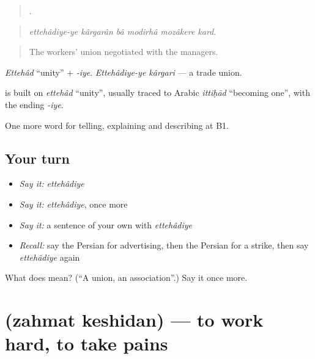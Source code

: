 \begin{quote}
     .
\end{quote}

\begin{quote}
\emph{ettehâdiye-ye kârgarân bâ modirhâ mozâkere kard.}
\end{quote}

\begin{quote}
The workers' union negotiated with the managers.
\end{quote}

\emph{Ettehâd} \textquotedblleft{}unity\textquotedblright{} + \emph{-iye}. \emph{Ettehâdiye-ye kârgari} — a trade union.

\begin{cousinweb}
\textbf{} is built on \emph{ettehâd} \textquotedblleft{}unity\textquotedblright{}, usually traced to Arabic \emph{ittiḥād} \textquotedblleft{}becoming one\textquotedblright{}, with the ending \emph{-iye}.
\end{cousinweb}

\begin{grammarlens}[title={What you've built}]
One more word for telling, explaining and describing at B1.
\end{grammarlens}

\subsection*{Your turn}
\begin{itemize}
\raggedright
  \item \emph{Say it:} \emph{ettehâdiye}
  \item \emph{Say it:} \emph{ettehâdiye}, once more
  \item \emph{Say it:} a sentence of your own with \emph{ettehâdiye}
  \item \emph{Recall:} say the Persian for advertising, then the Persian for a strike, then say \emph{ettehâdiye} again
\end{itemize}

\begin{tcolorbox}[breakable,colback=teal!4,colframe=teal!35!black,title={Before you move on}]
What does  mean? (\textquotedblleft{}A union, an association\textquotedblright{}.) Say it once more.
\end{tcolorbox}
\section[\texorpdfstring{\fa{زحمت} \fa{کشیدن} (zahmat keshidan)}{زحمت کشیدن (zahmat keshidan)}]{  (zahmat keshidan) — to work hard, to take pains}

